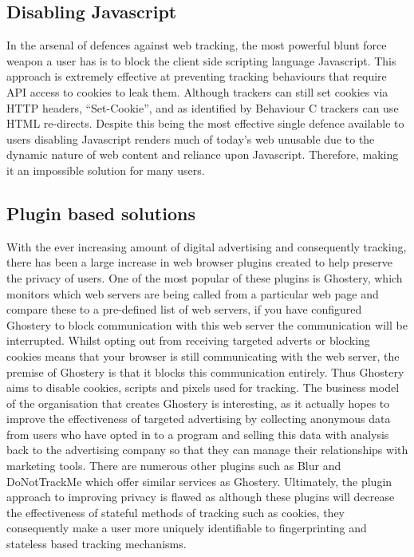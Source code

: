 \documentclass{article}
\begin{document}
\subsection{Disabling Javascript}
In the arsenal of defences against web tracking, the most powerful blunt force weapon a user has is to block the client side scripting language Javascript. This approach is extremely effective at preventing tracking behaviours that require API access to cookies to leak them. Although trackers can still set cookies via HTTP headers, ``Set-Cookie'', and as identified by \parencite{roesner} Behaviour C trackers can use HTML re-directs. Despite this being the most effective single defence available to users disabling Javascript renders much of today's web unusable due to the dynamic nature of web content and reliance upon Javascript. Therefore, making it an impossible solution for many users. 

\subsection{Plugin based solutions}
With the ever increasing amount of digital advertising and consequently tracking, there has been a large increase in web browser plugins created to help preserve the privacy of users. One of the most popular of these plugins is Ghostery, which monitors which web servers are being called from a particular web page and compare these to a pre-defined list of web servers, if you have configured Ghostery to block communication with this web server the communication will be interrupted. Whilst opting out from receiving targeted adverts or blocking cookies means that your browser is still communicating with the web server, the premise of Ghostery is that it blocks this communication entirely. Thus Ghostery aims to disable cookies, scripts and pixels used for tracking. The business model of the organisation that creates Ghostery is interesting, as it actually hopes to improve the effectiveness of targeted advertising by collecting anonymous data from users who have opted in to a program and selling this data with analysis back to the advertising company so that they can manage their relationships with marketing tools. There are numerous other plugins such as Blur and DoNotTrackMe which offer similar services as Ghostery. Ultimately, the plugin approach to improving privacy is flawed as although these plugins will decrease the effectiveness of stateful methods of tracking such as cookies, they consequently make a user more uniquely identifiable to fingerprinting and stateless based tracking mechanisms.
\end{document}
